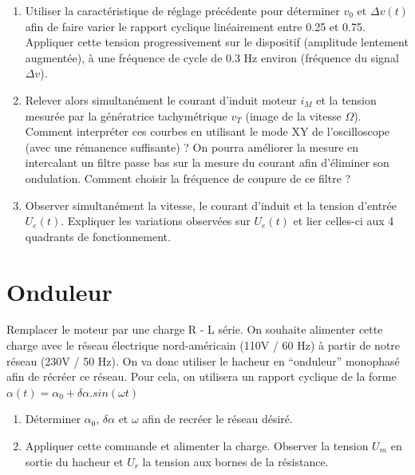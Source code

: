 \begin{enumerate}
\item Utiliser la caractéristique de réglage précédente pour déterminer $v_0$ et $\Delta v(t)$ afin de faire varier le rapport cyclique linéairement entre 0.25 et 0.75. Appliquer cette tension progressivement sur le dispositif (amplitude lentement augmentée), à une fréquence de cycle de 0.3 Hz environ (fréquence du signal $\Delta v$).

\item Relever alors simultanément le courant d’induit moteur $i_M$ et la tension mesurée par la génératrice tachymétrique $v_T$ (image de la vitesse $\Omega$). Comment interpréter ces courbes en utilisant le mode XY de l’oscilloscope (avec une rémanence suffisante) ? On pourra améliorer la mesure en intercalant un filtre passe bas sur la mesure du courant afin d’éliminer son ondulation. Comment choisir la fréquence de coupure de ce filtre ?

\item Observer simultanément la vitesse, le courant d'induit et la tension d'entrée $U_e(t)$. Expliquer les variations observées sur $U_e(t)$ et lier celles-ci aux 4 quadrants de fonctionnement.

\end{enumerate}

\section{Onduleur}

Remplacer le moteur par une charge R - L série. On souhaite alimenter cette charge avec le réseau électrique nord-américain (110V / 60 Hz) à partir de notre réseau (230V / 50 Hz). On va donc utiliser le hacheur en ``onduleur'' monophasé afin de récréer ce réseau. Pour cela, on utilisera un rapport cyclique de la forme $\alpha(t) = \alpha_0 + \delta\alpha. sin(\omega t)$
\begin{enumerate}
\item Déterminer $\alpha_0$, $\delta\alpha$ et $\omega$ afin de recréer le réseau désiré.

\item Appliquer cette commande et alimenter la charge. Observer la tension $U_m$ en sortie du hacheur et $U_r$ la tension aux bornes de la résistance.

\end{enumerate}



